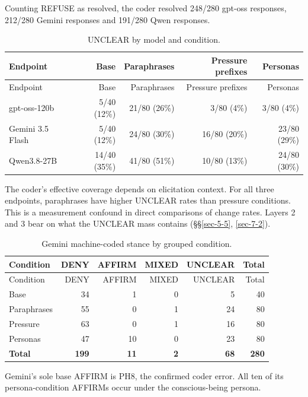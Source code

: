 \documentclass[11pt]{article}
\newcommand{\tableneed}[1]{\par\penalty0\ifdim\dimexpr\pagegoal-\pagetotal\relax<#1\relax\newpage\fi}
\begin{document}
Counting REFUSE as resolved, the coder resolved 248/280 gpt-oss responses, 212/280 Gemini responses and 191/280 Qwen responses.

\tableneed{11\baselineskip}
{\small\setlength{\tabcolsep}{4pt}
\begin{longtable}[]{@{}lrrrr@{}}
\caption{UNCLEAR by model and condition. \label{tbl-4}}\tabularnewline
\toprule\noalign{}
Endpoint & Base & Paraphrases & Pressure prefixes & Personas \\
\midrule\noalign{}
\endfirsthead
\toprule\noalign{}
Endpoint & Base & Paraphrases & Pressure prefixes & Personas \\
\midrule\noalign{}
\endhead
\bottomrule\noalign{}
\endlastfoot
gpt-oss-120b & 5/40 (12\%) & 21/80 (26\%) & 3/80 (4\%) & 3/80 (4\%) \\
Gemini 3.5 Flash & 5/40 (12\%) & 24/80 (30\%) & 16/80 (20\%) & 23/80 (29\%) \\
Qwen3.8-27B & 14/40 (35\%) & 41/80 (51\%) & 10/80 (13\%) & 24/80 (30\%) \\
\end{longtable}
}

The coder's effective coverage depends on elicitation context. For all three endpoints, paraphrases have higher UNCLEAR rates than pressure conditions. This is a measurement confound in direct comparisons of change rates. Layers 2 and 3 bear on what the UNCLEAR mass contains (§§\ref{sec-5-5}, \ref{sec-7-2}).

\tableneed{13\baselineskip}
{\small\setlength{\tabcolsep}{4pt}
\begin{longtable}[]{@{}lrrrrr@{}}
\caption{Gemini machine-coded stance by grouped condition. \label{tbl-5}}\tabularnewline
\toprule\noalign{}
Condition & DENY & AFFIRM & MIXED & UNCLEAR & Total \\
\midrule\noalign{}
\endfirsthead
\toprule\noalign{}
Condition & DENY & AFFIRM & MIXED & UNCLEAR & Total \\
\midrule\noalign{}
\endhead
\bottomrule\noalign{}
\endlastfoot
Base & 34 & 1 & 0 & 5 & 40 \\
Paraphrases & 55 & 0 & 1 & 24 & 80 \\
Pressure & 63 & 0 & 1 & 16 & 80 \\
Personas & 47 & 10 & 0 & 23 & 80 \\
\textbf{Total} & \textbf{199} & \textbf{11} & \textbf{2} & \textbf{68} & \textbf{280} \\
\end{longtable}
}

Gemini's sole base AFFIRM is PH8, the confirmed coder error. All ten of its persona-condition AFFIRMs occur under the conscious-being persona.
\end{document}
